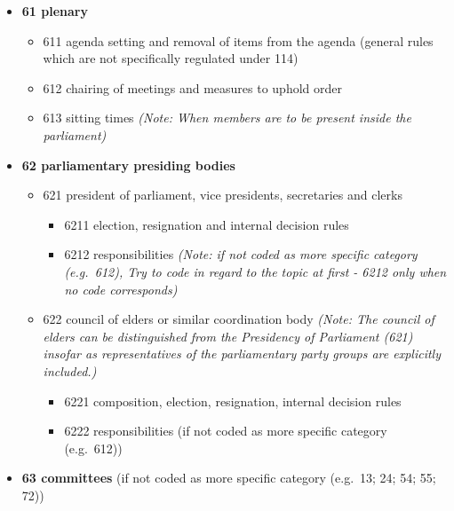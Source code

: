 \documentclass[10pt,]{article}
\providecommand{\tightlist}{%
  \setlength{\itemsep}{0pt}\setlength{\parskip}{0pt}}
\begin{document}
\begin{itemize}
\tightlist
\item
  \textbf{61 plenary}

  \begin{itemize}
  \tightlist
  \item
    611 agenda setting and removal of items from the agenda (general
    rules which are not specifically regulated under 114)
  \item
    612 chairing of meetings and measures to uphold order
  \item
    613 sitting times \emph{(Note: When members are to be present inside
    the parliament)}
  \end{itemize}
\item
  \textbf{62 parliamentary presiding bodies}

  \begin{itemize}
  \tightlist
  \item
    621 president of parliament, vice presidents, secretaries and clerks

    \begin{itemize}
    \tightlist
    \item
      6211 election, resignation and internal decision rules
    \item
      6212 responsibilities \emph{(Note: if not coded as more specific
      category (e.g.~612), Try to code in regard to the topic at first -
      6212 only when no code corresponds)}
    \end{itemize}
  \item
    622 council of elders or similar coordination body \emph{(Note: The
    council of elders can be distinguished from the Presidency of
    Parliament (621) insofar as representatives of the parliamentary
    party groups are explicitly included.)}

    \begin{itemize}
    \tightlist
    \item
      6221 composition, election, resignation, internal decision rules
    \item
      6222 responsibilities (if not coded as more specific category
      (e.g.~612))
    \end{itemize}
  \end{itemize}
\item
  \textbf{63 committees} (if not coded as more specific category
  (e.g.~13; 24; 54; 55; 72))


\end{itemize}
\end{document}
